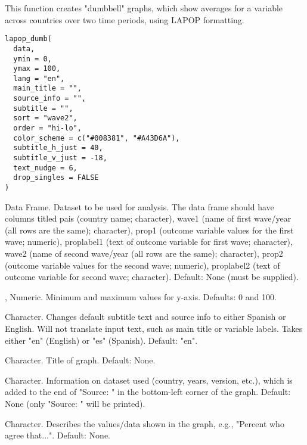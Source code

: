 \documentclass[a4paper]{book}
\begin{document}
%
\begin{Description}
This function creates "dumbbell" graphs, which show averages for a variable across countries over two time periods, using LAPOP formatting.
\end{Description}
%
\begin{Usage}
\begin{verbatim}
lapop_dumb(
  data,
  ymin = 0,
  ymax = 100,
  lang = "en",
  main_title = "",
  source_info = "",
  subtitle = "",
  sort = "wave2",
  order = "hi-lo",
  color_scheme = c("#008381", "#A43D6A"),
  subtitle_h_just = 40,
  subtitle_v_just = -18,
  text_nudge = 6,
  drop_singles = FALSE
)
\end{verbatim}
\end{Usage}
%
\begin{Arguments}
\begin{ldescription}
\item[\code{data}] Data Frame. Dataset to be used for analysis.  The data frame should have columns
titled pais (country name; character), wave1 (name of first wave/year (all rows are the same); character),
prop1 (outcome variable values for the first wave; numeric), proplabel1 (text of outcome variable for first wave; character),
wave2 (name of second wave/year (all rows are the same); character),
prop2 (outcome variable values for the second wave; numeric), proplabel2 (text of outcome variable for second wave; character).
Default: None (must be supplied).

\item[\code{ymin}, \code{ymax}] Numeric.  Minimum and maximum values for y-axis. Defaults: 0 and 100.

\item[\code{lang}] Character.  Changes default subtitle text and source info to either Spanish or English.
Will not translate input text, such as main title or variable labels.  Takes either "en" (English)
or "es" (Spanish).  Default: "en".

\item[\code{main\_title}] Character.  Title of graph.  Default: None.

\item[\code{source\_info}] Character.  Information on dataset used (country, years, version, etc.),
which is added to the end of "Source: " in the bottom-left corner of the graph.
Default: None (only "Source: " will be printed).

\item[\code{subtitle}] Character.  Describes the values/data shown in the graph, e.g., "Percent who agree that...".
Default: None.


\end{ldescription}
\end{Arguments}
\end{document}
